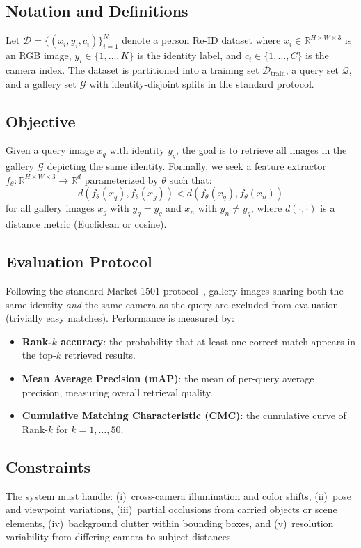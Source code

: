 \documentclass[final]{cvpr}
\begin{document}
\subsection{Notation and Definitions}
Let $\mathcal{D} = \{(x_i, y_i, c_i)\}_{i=1}^{N}$ denote a person Re-ID dataset where $x_i \in \mathbb{R}^{H \times W \times 3}$ is an RGB image, $y_i \in \{1, \ldots, K\}$ is the identity label, and $c_i \in \{1, \ldots, C\}$ is the camera index.
The dataset is partitioned into a training set $\mathcal{D}_{\text{train}}$, a query set $\mathcal{Q}$, and a gallery set $\mathcal{G}$ with identity-disjoint splits in the standard protocol.

\subsection{Objective}
Given a query image $x_q$ with identity $y_q$, the goal is to retrieve all images in the gallery $\mathcal{G}$ depicting the same identity.
Formally, we seek a feature extractor $f_\theta : \mathbb{R}^{H \times W \times 3} \rightarrow \mathbb{R}^d$ parameterized by $\theta$ such that:
\begin{equation}
    d(f_\theta(x_q), f_\theta(x_g)) < d(f_\theta(x_q), f_\theta(x_n))
\end{equation}
for all gallery images $x_g$ with $y_g = y_q$ and $x_n$ with $y_n \neq y_q$, where $d(\cdot, \cdot)$ is a distance metric (Euclidean or cosine).

\subsection{Evaluation Protocol}
Following the standard Market-1501 protocol~\cite{zheng2015market}, gallery images sharing both the same identity \emph{and} the same camera as the query are excluded from evaluation (trivially easy matches).
Performance is measured by:
\begin{itemize}
    \item \textbf{Rank-$k$ accuracy}: the probability that at least one correct match appears in the top-$k$ retrieved results.
    \item \textbf{Mean Average Precision (mAP)}: the mean of per-query average precision, measuring overall retrieval quality.
    \item \textbf{Cumulative Matching Characteristic (CMC)}: the cumulative curve of Rank-$k$ for $k = 1, \ldots, 50$.
\end{itemize}

\subsection{Constraints}
The system must handle:
(i)~cross-camera illumination and color shifts,
(ii)~pose and viewpoint variations,
(iii)~partial occlusions from carried objects or scene elements,
(iv)~background clutter within bounding boxes, and
(v)~resolution variability from differing camera-to-subject distances.
\end{document}
